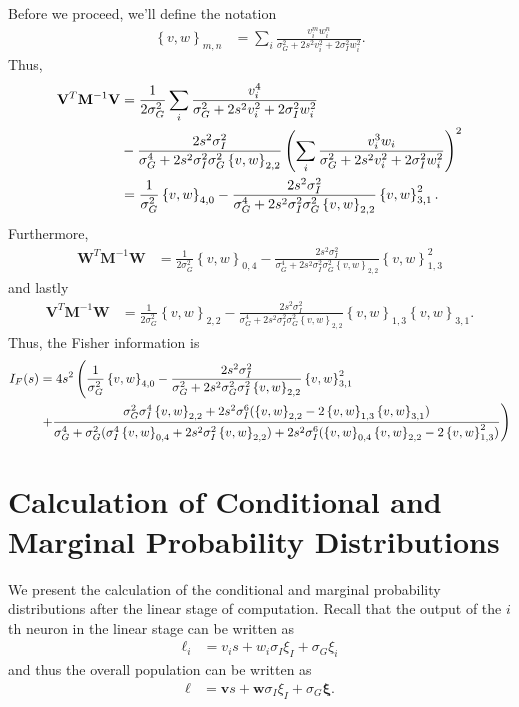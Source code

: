 \documentclass[11pt]{article}
\begin{document}
	Before we proceed, we'll define the notation 
	\begin{align}
	\left\{v, w\right\}_{m,n} &= \sum_i \frac{v_i^m w_i^n}{\sigma_G^2 + 2s^2 v_i^2 + 2\sigma_I^2 w_i^2}.
	\end{align}
	Thus,
	\begin{align}
	\mathbf{V}^T \mathbf{M}^{-1}\mathbf{V} &= \frac{1}{2\sigma_G^2}\sum_i \frac{v_i^4}{\sigma_G^2 + 2s^2 v_i^2  +2\sigma_I^2 w_i^2} \notag \\
	&- \frac{2s^2\sigma_I^2}{\sigma_G^4 + 2s^2 \sigma_I^2 \sigma_G^2 \left\{v,w\right\}_{2,2}} \left(\sum_i\frac{v_i^3 w_i}{\sigma_G^2 + 2s^2 v_i^2 + 2 \sigma_I^2 w_i^2}\right)^2 \\
	&= \frac{1}{\sigma_G^2}\left\{v,w\right\}_{4,0} - \frac{2s^2 \sigma_I^2}{\sigma_G^4 + 2s^2 \sigma_I^2 \sigma_G^2 \left\{v,w\right\}_{2,2}} \left\{v,w\right\}_{3,1}^2.
	\end{align}
	Furthermore,
	\begin{align}
	\mathbf{W}^T \mathbf{M}^{-1}\mathbf{W}  &= \frac{1}{2\sigma_G^2}\left\{v,w\right\}_{0,4} - \frac{2s^2\sigma_I^2}{\sigma_G^4 + 2s^2 \sigma_I^2 \sigma_G^2 \left\{v,w\right\}_{2,2}} \left\{v,w\right\}_{1,3}^2
	\end{align}
	and lastly
	\begin{align}
	\mathbf{V}^T \mathbf{M}^{-1} \mathbf{W} &= \frac{1}{2\sigma_G^2}\left\{v,w\right\}_{2,2} - \frac{2s^2\sigma_I^2}{\sigma_G^4 + 2s^2\sigma_I^2 \sigma_G^2\left\{v,w\right\}_{2,2}} \left\{v,w\right\}_{1,3}\left\{v,w\right\}_{3,1}.
	\end{align}
	Thus, the Fisher information is 
	\begin{align}
	I_F(s) &= 4s^2 \left(\frac{1}{\sigma_G^2}\left\{v, w\right\}_{4,0} - \frac{2s^2 \sigma_I^2}{\sigma_G^2 + 2s^2 \sigma_G^2 \sigma_I^2 \left\{v,w\right\}_{2,2}} \left\{v,w\right\}_{3,1}^2  \right. \notag \\
	&\left. + \frac{\sigma_G^2 \sigma_I^4 \left\{v,w\right\}_{2,2} + 2s^2 \sigma_I^6 (\left\{v,w\right\}_{2,2} - 2 \left\{v,w\right\}_{1,3} \left\{v,w\right\}_{3,1})}{\sigma_G^4  + \sigma_G^2 (\sigma_I^4 \left\{v,w\right\}_{0,4} + 2s^2 \sigma_I^2 \left\{v,w\right\}_{2,2}) + 2s^2 \sigma_I^6 (\left\{v,w\right\}_{0,4} \left\{v,w\right\}_{2,2} - 2 \left\{v,w\right\}_{1,3}^2)}\right)
	\end{align}
	\newpage
	\section{Calculation of Conditional and Marginal Probability Distributions}
	We present the calculation of the conditional and marginal probability distributions after the linear stage of computation. Recall that the output of the $i$th neuron in the linear stage can be written as
	\begin{align}
		\ell_i &= v_i s + w_i \sigma_I \xi_I + \sigma_G\xi_i
	\end{align}
	and thus the overall population can be written as 
	\begin{align}
		\boldsymbol{\ell} &= \mathbf{v} s + \mathbf{w} \sigma_I \xi_I + \sigma_G \boldsymbol{\xi}.
	\end{align}
	
\end{document}
